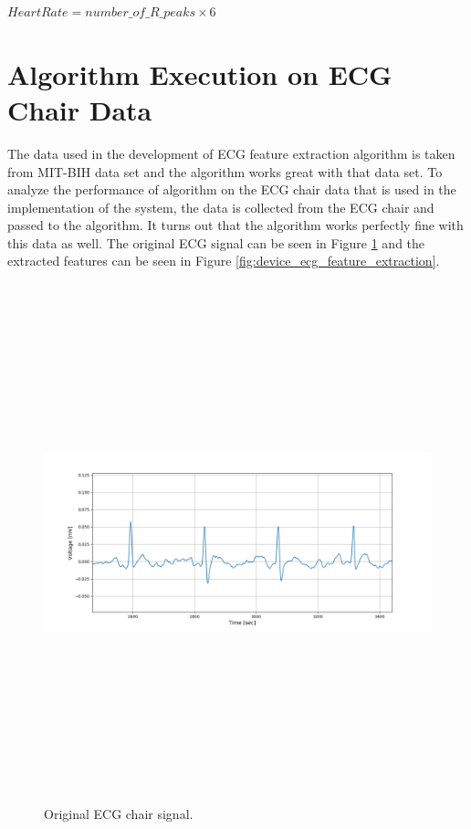 \begin{center}
	$HeartRate = number\_of\_R\_peaks \times 6$
\end{center}

\section{Algorithm Execution on ECG Chair Data}
The data used in the development of ECG feature extraction algorithm is taken from MIT-BIH data set and the algorithm works great with that data set. To analyze the performance of algorithm on the ECG chair data that is used in the implementation of the system, the data is collected from the ECG chair and passed to the algorithm. It turns out that the algorithm works perfectly fine with this data as well. The original ECG signal can be seen in Figure \ref{fig:device_ecg_orignal} and the extracted features can be seen in Figure \ref{fig:device_ecg_feature_extraction}.

\begin{figure}[htpb]
	\centering
	\includegraphics[width=15cm,height=15cm,keepaspectratio=true]{images/device_ecg_orignal}
	\caption{
		Original ECG chair signal.
	}
	\label{fig:device_ecg_orignal}
\end{figure}


